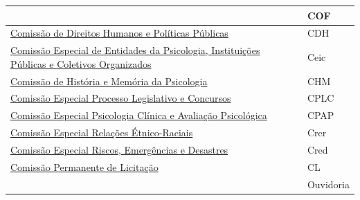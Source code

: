 \begin{center}
\begin{tabularx}{0.8\textwidth}{
			>{\centering\arraybackslash}X
			>{\centering\arraybackslash}X  }
{    de Orientação e Fiscalização} &
    COF \\
    \midrule
    \href{https://transparencia.cfp.org.br/wp-content/uploads/sites/29/2020/08/Resolucao-CRP-002-20-Institui-a-CDHPP-final-1.pdf}{Comissão
    de Direitos Humanos e Políticas Públicas} &
    CDH \\
    \midrule
    \href{https://transparencia.cfp.org.br/wp-content/uploads/sites/29/2024/06/Resolucao-03-2024.pdf}{Comissão
    Especial de Entidades da Psicologia, Instituições Públicas e Coletivos Organizados} &
    Ceic\\
    \midrule
    \href{https://transparencia.cfp.org.br/wp-content/uploads/sites/29/2020/08/Resolucao-CRP-005-20-Institui-a-Comissao-Historia-e-Memoria-final.pdf}{Comissão
    de História e Memória da Psicologia} &
    CHM \\
    \midrule
    \href{https://atosoficiais.com.br/cfp/resolucao-administrativa-financeira-n-5-2023-aprova-o-regimento-interno-do-conselho-regional-de-psicologia-de-sao-paulo-6a-regiao?origin=instituicao   q=05/2023}{Comissão
    Especial Processo Legislativo e Concursos} &
    CPLC\\
    \midrule
    \href{https://transparencia.cfp.org.br/wp-content/uploads/sites/29/2024/06/Resolucao-03-2024.pdf}{Comissão
    Especial Psicologia Clínica e Avaliação Psicológica} &
    CPAP\\
    \midrule
    \href{https://transparencia.cfp.org.br/wp-content/uploads/sites/29/2024/06/Resolucao-03-2024.pdf}{Comissão
    Especial Relações Étnico-Raciais} &
    Crer\\
    \midrule
    \href{https://transparencia.cfp.org.br/wp-content/uploads/sites/29/2024/06/Resolucao-03-2024.pdf}{Comissão
    Especial Riscos, Emergências e Desastres} &
    Cred\\
    \midrule
    \href{https://atosoficiais.com.br/cfp/resolucao-administrativa-financeira-n-5-2023-aprova-o-regimento-interno-do-conselho-regional-de-psicologia-de-sao-paulo-6a-regiao?origin=instituicao   q=05/2023}{Comissão
    Permanente de Licitação} &
    CL\\
    \midrule
    \href{https://atosoficiais.com.br/cfp/resolucao-administrativa-financeira-n-5-2023-aprova-o-regimento-interno-do-conselho-regional-de-psicologia-de-sao-paulo-6a-regiao?origin=instituicao   q=05/2023} &
    {Ouvidoria}\\
    \bottomrule
  \end{tabularx}
\end{center}

